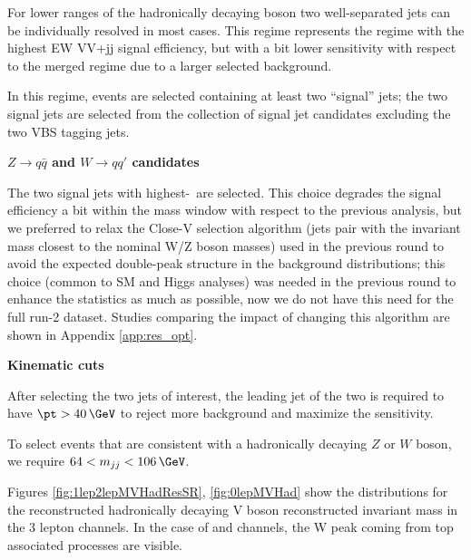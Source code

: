 For lower \pT ranges of the hadronically decaying boson two well-separated jets can be individually resolved in most cases. This regime represents the regime with the highest EW VV+jj signal efficiency, but with a bit lower sensitivity with respect to the merged regime due to a larger selected background.

In this regime, events are selected containing at least two ``signal'' jets;
the two signal jets are selected from the collection of signal jet candidates excluding the
two VBS tagging jets. 

\textbf{$Z \to q\bar{q}$ and $W \to qq'$ candidates}

The two signal jets with highest-\pt\ are selected. This choice degrades the signal efficiency a bit within the mass window with respect to the previous analysis, but we preferred to relax the Close-V selection algorithm (jets pair with the invariant mass closest to the nominal W/Z boson masses) used in the previous round to avoid the expected double-peak structure in the background distributions; this choice (common to SM and Higgs analyses) was needed in the previous round to enhance the statistics as much as possible, now we do not have this need for the full run-2 dataset. Studies comparing the impact of changing this algorithm are shown in Appendix \ref{app:res_opt}.

\textbf{Kinematic cuts}

After selecting the two jets of interest, the leading jet of the two is required to have $\pt>40\,\GeV$ 
to reject more background and maximize the sensitivity.
 
To select events that are consistent with a hadronically decaying $Z$ or $W$ boson, we require $64 <m_{jj}<106\,\GeV$.

Figures \ref{fig:1lep2lepMVHadResSR}, \ref{fig:0lepMVHad} show the distributions 
for the reconstructed hadronically decaying V boson reconstructed invariant mass in the 3 lepton channels. 
In the case of \zlep and \olep channels, the W peak coming from top associated processes are visible.

